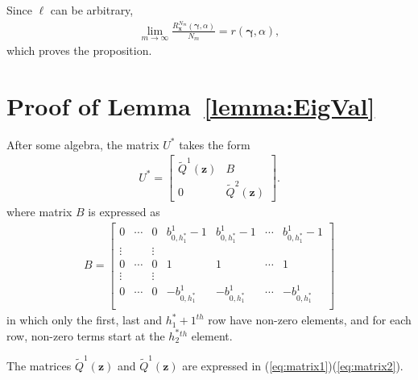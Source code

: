 \documentclass[11pt,twocolumn]{IEEEtran}
\begin{document}
Since $\ell$ can be arbitrary,
\begin{align}
\lim_{m\rightarrow \infty} \frac{R^{N_m}_{\bm x}(\bm \gamma, \alpha)}{N_m}=r(\bm \gamma, \alpha) \nonumber,
\end{align}
which proves the proposition.

\section{Proof of Lemma~\ref{lemma:EigVal}}
\label{appen:EigVal}

After some algebra, the matrix $U^*$ takes the form
\begin{align}
\nonumber
U^* = \begin{bmatrix}\tilde{Q}^1(\bm z) &  B \\
0 & \tilde{Q}^2(\bm z)
\end{bmatrix}.
\end{align}
where matrix $B$ is expressed as
\begin{align}
\nonumber
B =\begin{bmatrix}
0&{\cdots}& 0 & b^1_{0,h_1^*}{-}1& b^1_{0,h_1^*}{-}1& {\cdots}& b^1_{0,h_1^*}{-}1\\
{\vdots} & & {\vdots} & & & &\\
0 & {\cdots} & 0 & 1 & 1 & {\cdots} &1\\
{\vdots}& & {\vdots} &  &  &  &\\
0& {\cdots} & 0 &  -b^1_{0,h_1^*}& -b^1_{0,h_1^*}& {\cdots}& -b^1_{0,h_1^*}\\
\end{bmatrix}
\end{align}
in which only the first, last and $h^*_1+1^{th}$ row have non-zero elements, and for each row, non-zero terms start at the $h^*_2$$^{th}$ element.

The matrices $\tilde{Q}^1(\bm z)$ and $\tilde{Q}^1(\bm z)$ are expressed in (\ref{eq:matrix1})(\ref{eq:matrix2}).
\end{document}
